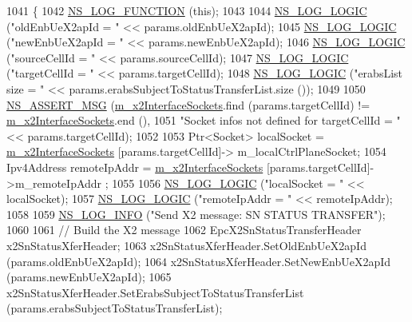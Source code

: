 \begin{DoxyCode}
1041 \{
1042   \hyperlink{log-macros-disabled_8h_a90b90d5bad1f39cb1b64923ea94c0761}{NS\_LOG\_FUNCTION} (\textcolor{keyword}{this});
1043 
1044   \hyperlink{group__logging_ga88acd260151caf2db9c0fc84997f45ce}{NS\_LOG\_LOGIC} (\textcolor{stringliteral}{"oldEnbUeX2apId = "} << params.oldEnbUeX2apId);
1045   \hyperlink{group__logging_ga88acd260151caf2db9c0fc84997f45ce}{NS\_LOG\_LOGIC} (\textcolor{stringliteral}{"newEnbUeX2apId = "} << params.newEnbUeX2apId);
1046   \hyperlink{group__logging_ga88acd260151caf2db9c0fc84997f45ce}{NS\_LOG\_LOGIC} (\textcolor{stringliteral}{"sourceCellId = "} << params.sourceCellId);
1047   \hyperlink{group__logging_ga88acd260151caf2db9c0fc84997f45ce}{NS\_LOG\_LOGIC} (\textcolor{stringliteral}{"targetCellId = "} << params.targetCellId);
1048   \hyperlink{group__logging_ga88acd260151caf2db9c0fc84997f45ce}{NS\_LOG\_LOGIC} (\textcolor{stringliteral}{"erabsList size = "} << params.erabsSubjectToStatusTransferList.size ());
1049 
1050   \hyperlink{assert_8h_aff5ece9066c74e681e74999856f08539}{NS\_ASSERT\_MSG} (\hyperlink{classns3_1_1EpcX2_a0665276228b9b99a52ef6d5e9bdb306d}{m\_x2InterfaceSockets}.find (params.targetCellId) != 
      \hyperlink{classns3_1_1EpcX2_a0665276228b9b99a52ef6d5e9bdb306d}{m\_x2InterfaceSockets}.end (),
1051                  \textcolor{stringliteral}{"Socket infos not defined for targetCellId = "} << params.targetCellId);
1052 
1053   Ptr<Socket> localSocket = \hyperlink{classns3_1_1EpcX2_a0665276228b9b99a52ef6d5e9bdb306d}{m\_x2InterfaceSockets} [params.targetCellId]->
      m\_localCtrlPlaneSocket;
1054   Ipv4Address remoteIpAddr = \hyperlink{classns3_1_1EpcX2_a0665276228b9b99a52ef6d5e9bdb306d}{m\_x2InterfaceSockets} [params.targetCellId]->m\_remoteIpAddr
      ;
1055 
1056   \hyperlink{group__logging_ga88acd260151caf2db9c0fc84997f45ce}{NS\_LOG\_LOGIC} (\textcolor{stringliteral}{"localSocket = "} << localSocket);
1057   \hyperlink{group__logging_ga88acd260151caf2db9c0fc84997f45ce}{NS\_LOG\_LOGIC} (\textcolor{stringliteral}{"remoteIpAddr = "} << remoteIpAddr);
1058 
1059   \hyperlink{group__logging_gafbd73ee2cf9f26b319f49086d8e860fb}{NS\_LOG\_INFO} (\textcolor{stringliteral}{"Send X2 message: SN STATUS TRANSFER"});
1060 
1061   \textcolor{comment}{// Build the X2 message}
1062   EpcX2SnStatusTransferHeader x2SnStatusXferHeader;
1063   x2SnStatusXferHeader.SetOldEnbUeX2apId (params.oldEnbUeX2apId);
1064   x2SnStatusXferHeader.SetNewEnbUeX2apId (params.newEnbUeX2apId);
1065   x2SnStatusXferHeader.SetErabsSubjectToStatusTransferList (params.erabsSubjectToStatusTransferList);

\end{DoxyCode}
